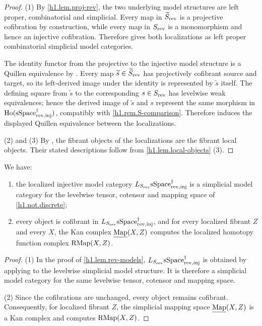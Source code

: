 \documentclass[a4paper,dvipdfmx,11pt]{amsart}
\begin{document}
\begin{proof}
  (1)
  By \cref{h1.lem.proj-rev}, the two underlying model structures are left proper, combinatorial and simplicial.
  Every map in $\widetilde S_{\mathrm{rev}}$ is a projective cofibration by construction, while every map in $S_{\mathrm{rev}}$ is a monomorphism and hence an injective cofibration.
  Therefore \cite[Proposition~A.3.7.3]{HTT} gives both localizations as left proper combinatorial simplicial model categories.

  The identity functor from the projective to the injective model structure is a Quillen equivalence by \cite[Remark~A.2.8.6]{HTT}.
  Every map $\widetilde s\in\widetilde S_{\mathrm{rev}}$ has projectively cofibrant source and target, so its left-derived image under the identity is represented by $\widetilde s$ itself.
  The defining square from $\widetilde s$ to the corresponding $s\in S_{\mathrm{rev}}$ has levelwise weak equivalences;
  hence the derived image of $\widetilde s$ and $s$ represent the same morphism in $\mathrm{Ho}(\mathrm{sSpace}^{\dag}_{\mathrm{rev},\mathrm{inj}})$, compatibly with \cref{h1.rem.S-comparison}.
  Therefore \cite[Theorem~3.3.20 (1)(b)]{Hir02} induces the displayed Quillen equivalence between the localizations.

  (2) and (3)
  By \cite[Proposition~A.3.7.3 (3)]{HTT}, the fibrant objects of the localizations are the fibrant local objects.
  Their stated descriptions follow from \cref{h1.lem.local-objects} (3).
\end{proof}

\begin{corollary}\label{h1.lem.localized-simplicial}
  We have:
  \begin{enumerate}
    \item the localized injective model category $L_{S_{\mathrm{rev}}}\mathrm{sSpace}^{\dag}_{\mathrm{rev},\mathrm{inj}}$ is a simplicial model category for the levelwise tensor, cotensor and mapping space of \cref{h1.not.discrete};
    \item every object is cofibrant in $L_{S_{\mathrm{rev}}}\mathrm{sSpace}^{\dag}_{\mathrm{rev},\mathrm{inj}}$, and for every localized fibrant $Z$ and every $X$, the Kan complex $\underline{\operatorname{Map}}(X,Z)$ computes the localized homotopy function complex $\mathrm{RMap}(X,Z)$.
  \end{enumerate}
\end{corollary}

\begin{proof}
  (1)
  In the proof of \cref{h1.lem.rev-models}, $L_{S_{\mathrm{rev}}}\mathrm{sSpace}^{\dag}_{\mathrm{rev},\mathrm{inj}}$ is obtained by applying \cite[Proposition~A.3.7.3]{HTT} to the levelwise simplicial model structure.
  It is therefore a simplicial model category for the same levelwise tensor, cotensor and mapping space.

  (2)
  Since the cofibrations are unchanged, every object remains cofibrant.
  Consequently, for localized fibrant $Z$, the simplicial mapping space $\underline{\operatorname{Map}}(X,Z)$ is a Kan complex and computes $\mathrm{RMap}(X,Z)$.
\end{proof}
\end{document}

